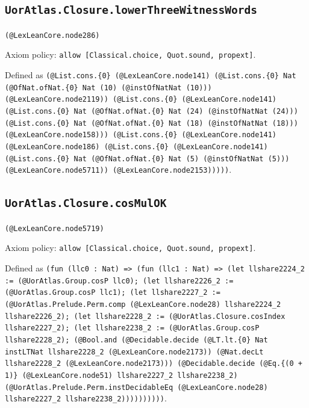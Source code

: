 \documentclass[11pt]{article}
\begin{document}
\subsection*{\texttt{UorAtlas.Closure.lowerThreeWitnessWords}}
\noindent\texttt{(@LexLeanCore.node286)}\par
\noindent Axiom policy: \texttt{allow [Classical.choice, Quot.sound, propext]}.\par
\noindent Defined as \texttt{(@List.cons.\{0\} (@LexLeanCore.node141) (@List.cons.\{0\} Nat (@OfNat.ofNat.\{0\} Nat (10) (@instOfNatNat (10))) (@LexLeanCore.node2119)) (@List.cons.\{0\} (@LexLeanCore.node141) (@List.cons.\{0\} Nat (@OfNat.ofNat.\{0\} Nat (24) (@instOfNatNat (24))) (@List.cons.\{0\} Nat (@OfNat.ofNat.\{0\} Nat (18) (@instOfNatNat (18))) (@LexLeanCore.node158))) (@List.cons.\{0\} (@LexLeanCore.node141) (@LexLeanCore.node186) (@List.cons.\{0\} (@LexLeanCore.node141) (@List.cons.\{0\} Nat (@OfNat.ofNat.\{0\} Nat (5) (@instOfNatNat (5))) (@LexLeanCore.node5711)) (@LexLeanCore.node2153)))))}.\par
\subsection*{\texttt{UorAtlas.Closure.cosMulOK}}
\noindent\texttt{(@LexLeanCore.node5719)}\par
\noindent Axiom policy: \texttt{allow [Classical.choice, Quot.sound, propext]}.\par
\noindent Defined as \texttt{(fun (llc0 : Nat) => (fun (llc1 : Nat) => (let llshare2224\_2 := (@UorAtlas.Group.cosP llc0); (let llshare2226\_2 := (@UorAtlas.Group.cosP llc1); (let llshare2227\_2 := (@UorAtlas.Prelude.Perm.comp (@LexLeanCore.node28) llshare2224\_2 llshare2226\_2); (let llshare2228\_2 := (@UorAtlas.Closure.cosIndex llshare2227\_2); (let llshare2238\_2 := (@UorAtlas.Group.cosP llshare2228\_2); (@Bool.and (@Decidable.decide (@LT.lt.\{0\} Nat instLTNat llshare2228\_2 (@LexLeanCore.node2173)) (@Nat.decLt llshare2228\_2 (@LexLeanCore.node2173))) (@Decidable.decide (@Eq.\{(0 + 1)\} (@LexLeanCore.node51) llshare2227\_2 llshare2238\_2) (@UorAtlas.Prelude.Perm.instDecidableEq (@LexLeanCore.node28) llshare2227\_2 llshare2238\_2))))))))))}.\par
\end{document}

